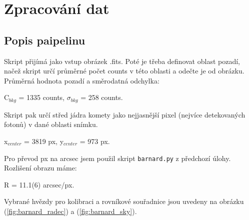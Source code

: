 \documentclass[a4paper,11pt]{article}
\begin{document}
    \begin{minipage}[t]{0.5\textwidth} 
        
        \section{Zpracování dat}
        \subsection{Popis paipelinu}    
            Skript přijímá jako vstup obrázek .fits. Poté je třeba definovat oblast pozadí, načež skript určí průměrné počet counts v této oblasti a odečte je od obrázku. Průměrná hodnota pozadí a směrodatná odchylka: 
            \begin{center}
                C$_{bkg}$ = 1335 counts, $\sigma_{bkg}$ = 258 counts.
            \end{center}
            \par Skript pak určí střed jádra komety jako nejjasnější pixel (nejvíce detekovaných fotonů) v dané oblasti snímku.
            \begin{center}
                x$_{center}$ = 3819 px, y$_{center}$ = 973 px.
            \end{center}
            \par Pro převod px na arcsec jsem použil skript \texttt{barnard.py} z předchozí úlohy. Rozlišení obrazu máme:
            \begin{center}
                R = 11.1(6) arcsec/px.
            \end{center}
            Vybrané hvězdy pro kolibraci a rovníkové souřadnice jsou uvedeny na obrázku (\ref{fig:barnard_radec}) a (\ref{fig:barnard_sky}).


\end{minipage}
\end{document}
